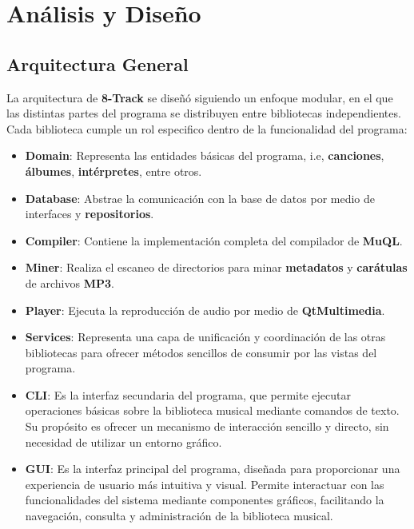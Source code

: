 \section{Análisis y Diseño}

\subsection{Arquitectura General}

La arquitectura de \textbf{8-Track} se diseñó siguiendo un enfoque modular, en el que las
distintas partes del programa se distribuyen entre bibliotecas independientes. Cada
biblioteca cumple un rol especifico dentro de la funcionalidad del programa:

\begin{itemize}
	\item \textbf{Domain}: Representa las entidades básicas del programa, i.e, \textbf{canciones},
	      \textbf{álbumes}, \textbf{intérpretes}, entre otros.
	\item \textbf{Database}: Abstrae la comunicación con la base de datos por medio de
	      interfaces y \textbf{repositorios}.
	\item \textbf{Compiler}: Contiene la implementación completa del compilador de \textbf{MuQL}.
	\item \textbf{Miner}: Realiza el escaneo de directorios para minar \textbf{metadatos}
	      y \textbf{carátulas} de archivos \textbf{MP3}.
	\item \textbf{Player}: Ejecuta la reproducción de audio por medio de \textbf{QtMultimedia}.
	\item \textbf{Services}: Representa una capa de unificación y coordinación de las otras bibliotecas
	      para ofrecer métodos sencillos de consumir por las vistas del programa.
	\item \textbf{CLI}: Es la interfaz secundaria del programa, que permite ejecutar operaciones
	      básicas sobre la biblioteca musical mediante comandos de texto. Su propósito es
	      ofrecer un mecanismo de interacción sencillo y directo, sin necesidad de utilizar un
	      entorno gráfico.

	\item \textbf{GUI}: Es la interfaz principal del programa, diseñada para proporcionar una
	      experiencia de usuario más intuitiva y visual. Permite interactuar
	      con las funcionalidades del sistema mediante componentes gráficos, facilitando la
	      navegación, consulta y administración de la biblioteca musical.
\end{itemize}

